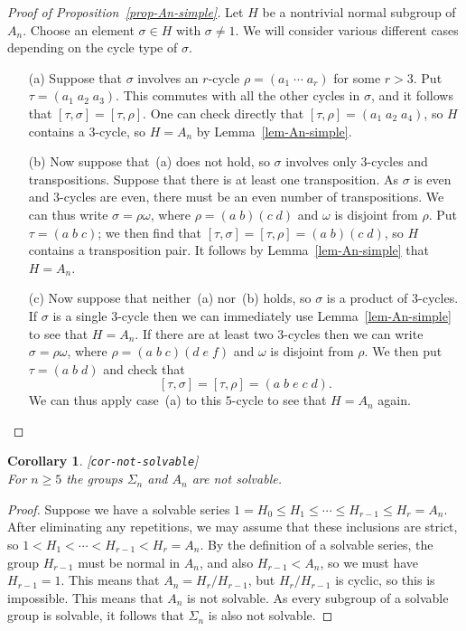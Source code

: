 \documentclass{amsart}
\newcommand{\lbl}[1]{\label{#1}\textup{[\texttt{#1}]}\ \\}
\newcommand{\lbl}{\label}
\newcommand{\sg}        {\sigma}
\newcommand{\om}        {\omega}
\newcommand{\Sg}        {\Sigma}
\renewcommand{\:}{\colon}
\newtheorem{corollary}[theorem]{Corollary}
\theoremstyle{definition}
\begin{document}
\begin{proof}[Proof of Proposition~\ref{prop-An-simple}]
 Let $H$ be a nontrivial normal subgroup of $A_n$.  Choose an element
 $\sg\in H$ with $\sg\neq 1$.  We will consider various different
 cases depending on the cycle type of $\sg$.
 \begin{itemize}
  \item[(a)] Suppose that $\sg$ involves an $r$-cycle
   $\rho=(a_1\;\dotsb\;a_r)$ for some $r>3$.  Put
   $\tau=(a_1\;a_2\;a_3)$.  This commutes with all the other cycles in
   $\sg$, and it follows that $[\tau,\sg]=[\tau,\rho]$.  One can check
   directly that $[\tau,\rho]=(a_1\;a_2\;a_4)$, so $H$ contains a
   $3$-cycle, so $H=A_n$ by Lemma~\ref{lem-An-simple}.
  \item[(b)] Now suppose that~(a) does not hold, so $\sg$ involves
   only $3$-cycles and transpositions.  Suppose that there is at least
   one transposition.  As $\sg$ is even and $3$-cycles are even, there
   must be an even number of transpositions.  We can thus write
   $\sg=\rho\om$, where $\rho=(a\;b)(c\;d)$ and $\om$ is disjoint from
   $\rho$.  Put $\tau=(a\;b\;c)$; we then find that
   $[\tau,\sg]=[\tau,\rho]=(a\;b)(c\;d)$, so $H$ contains a
   transposition pair.  It follows by Lemma~\ref{lem-An-simple} that
   $H=A_n$.
  \item[(c)] Now suppose that neither~(a) nor~(b) holds, so $\sg$ is a
   product of $3$-cycles.  If $\sg$ is a single $3$-cycle then we can
   immediately use Lemma~\ref{lem-An-simple} to see that $H=A_n$.  If
   there are at least two $3$-cycles then we can write $\sg=\rho\om$,
   where $\rho=(a\;b\;c)(d\;e\;f)$ and $\om$ is disjoint from $\rho$.
   We then put $\tau=(a\;b\;d)$ and check that 
   \[ [\tau,\sg] = [\tau,\rho] = (a\;b\;e\;c\;d). \]
   We can thus apply case~(a) to this $5$-cycle to see that $H=A_n$
   again. 
 \end{itemize}
\end{proof}

\begin{corollary}\lbl{cor-not-solvable}
 For $n\geq 5$ the groups $\Sg_n$ and $A_n$ are not solvable.
\end{corollary}
\begin{proof}
 Suppose we have a solvable series
 $1=H_0\leq H_1\leq \dotsb\leq H_{r-1}\leq H_r=A_n$.  After
 eliminating any repetitions, we may assume that these inclusions are
 strict, so $1<H_1<\dotsb<H_{r-1}<H_r=A_n$.  By the definition of a
 solvable series, the group $H_{r-1}$ must be normal in $A_n$, and
 also $H_{r-1}<A_n$, so we must have $H_{r-1}=1$.  This means that
 $A_n=H_r/H_{r-1}$, but $H_r/H_{r-1}$ is cyclic, so this is
 impossible.  This means that $A_n$ is not solvable.  As every
 subgroup of a solvable group is solvable, it follows that $\Sg_n$ is
 also not solvable.
\end{proof}
\end{document}
